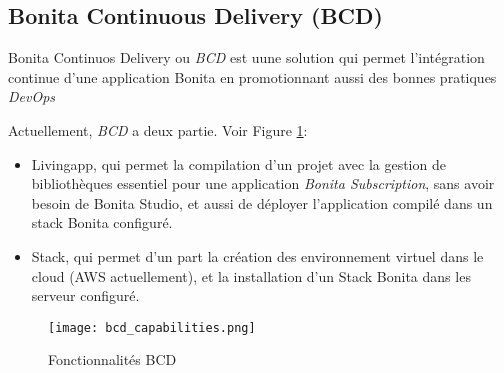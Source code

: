 \subsection{Bonita Continuous Delivery (BCD)} \label{bcd}
Bonita Continuos Delivery ou \textit{BCD} est uune solution qui permet l'intégration continue d'une application Bonita en promotionnant aussi des bonnes pratiques \emph{DevOps}

Actuellement, \textit{BCD} a deux partie. Voir Figure \ref{fig:bcd_cap}:
\begin{itemize}
  \item Livingapp, qui permet la compilation d'un projet avec la gestion de bibliothèques essentiel pour une application \textit{Bonita Subscription}, sans avoir besoin de Bonita Studio, et aussi de déployer l'application compilé dans un stack Bonita configuré.
  \item Stack, qui permet d'un part la création des environnement virtuel dans le cloud (AWS actuellement), et la installation d'un Stack Bonita dans les serveur configuré.
\end{itemize}

\begin{figure}[!ht]
\centering
\texttt{[image: bcd\_capabilities.png]}
\caption{Fonctionnalités BCD}
\label{fig:bcd_cap}
\end{figure}
